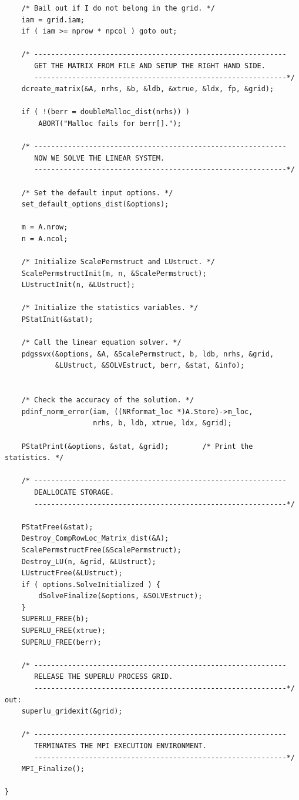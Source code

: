 \begin{verbatim}
    /* Bail out if I do not belong in the grid. */
    iam = grid.iam;
    if ( iam >= nprow * npcol )	goto out;

    /* ------------------------------------------------------------
       GET THE MATRIX FROM FILE AND SETUP THE RIGHT HAND SIDE. 
       ------------------------------------------------------------*/
    dcreate_matrix(&A, nrhs, &b, &ldb, &xtrue, &ldx, fp, &grid);

    if ( !(berr = doubleMalloc_dist(nrhs)) )
        ABORT("Malloc fails for berr[].");

    /* ------------------------------------------------------------
       NOW WE SOLVE THE LINEAR SYSTEM.
       ------------------------------------------------------------*/

    /* Set the default input options. */
    set_default_options_dist(&options);

    m = A.nrow;
    n = A.ncol;

    /* Initialize ScalePermstruct and LUstruct. */
    ScalePermstructInit(m, n, &ScalePermstruct);
    LUstructInit(n, &LUstruct);

    /* Initialize the statistics variables. */
    PStatInit(&stat);

    /* Call the linear equation solver. */
    pdgssvx(&options, &A, &ScalePermstruct, b, ldb, nrhs, &grid,
            &LUstruct, &SOLVEstruct, berr, &stat, &info);


    /* Check the accuracy of the solution. */
    pdinf_norm_error(iam, ((NRformat_loc *)A.Store)->m_loc,
                     nrhs, b, ldb, xtrue, ldx, &grid);

    PStatPrint(&options, &stat, &grid);        /* Print the statistics. */

    /* ------------------------------------------------------------
       DEALLOCATE STORAGE.
       ------------------------------------------------------------*/

    PStatFree(&stat);
    Destroy_CompRowLoc_Matrix_dist(&A);
    ScalePermstructFree(&ScalePermstruct);
    Destroy_LU(n, &grid, &LUstruct);
    LUstructFree(&LUstruct);
    if ( options.SolveInitialized ) {
        dSolveFinalize(&options, &SOLVEstruct);
    }
    SUPERLU_FREE(b);
    SUPERLU_FREE(xtrue);
    SUPERLU_FREE(berr);

    /* ------------------------------------------------------------
       RELEASE THE SUPERLU PROCESS GRID.
       ------------------------------------------------------------*/
out:
    superlu_gridexit(&grid);

    /* ------------------------------------------------------------
       TERMINATES THE MPI EXECUTION ENVIRONMENT.
       ------------------------------------------------------------*/
    MPI_Finalize();

}
\end{verbatim}

